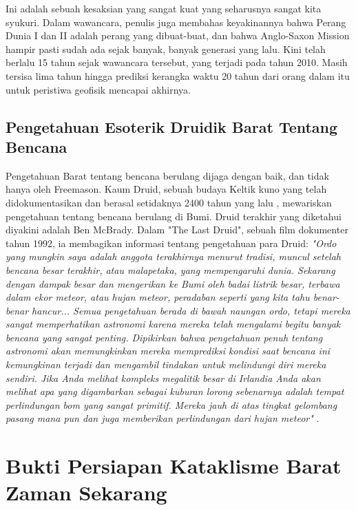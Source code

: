 \documentclass[10pt,twocolumn,letterpaper]{article}
\begin{document}
Ini adalah sebuah kesaksian yang sangat kuat yang seharusnya sangat kita syukuri. Dalam wawancara, penulis juga membahas keyakinannya bahwa Perang Dunia I dan II adalah perang yang dibuat-buat, dan bahwa Anglo-Saxon Mission hampir pasti sudah ada sejak banyak, banyak generasi yang lalu. Kini telah berlalu 15 tahun sejak wawancara tersebut, yang terjadi pada tahun 2010. Masih tersisa lima tahun hingga prediksi kerangka waktu 20 tahun dari orang dalam itu untuk peristiwa geofisik mencapai akhirnya.

\subsection{Pengetahuan Esoterik Druidik Barat Tentang Bencana}

Pengetahuan Barat tentang bencana berulang dijaga dengan baik, dan tidak hanya oleh Freemason. Kaum Druid, sebuah budaya Keltik kuno yang telah didokumentasikan dan berasal setidaknya 2400 tahun yang lalu \cite{7}, mewariskan pengetahuan tentang bencana berulang di Bumi. Druid terakhir yang diketahui diyakini adalah Ben McBrady. Dalam "The Last Druid", sebuah film dokumenter tahun 1992, ia membagikan informasi tentang pengetahuan para Druid: \textit{"Ordo yang mungkin saya adalah anggota terakhirnya menurut tradisi, muncul setelah bencana besar terakhir, atau malapetaka, yang mempengaruhi dunia. Sekarang dengan dampak besar dan mengerikan ke Bumi oleh badai listrik besar, terbawa dalam ekor meteor, atau hujan meteor, peradaban seperti yang kita tahu benar-benar hancur... Semua pengetahuan berada di bawah naungan ordo, tetapi mereka sangat memperhatikan astronomi karena mereka telah mengalami begitu banyak bencana yang sangat penting. Dipikirkan bahwa pengetahuan penuh tentang astronomi akan memungkinkan mereka memprediksi kondisi saat bencana ini kemungkinan terjadi dan mengambil tindakan untuk melindungi diri mereka sendiri. Jika Anda melihat kompleks megalitik besar di Irlandia Anda akan melihat apa yang digambarkan sebagai kuburan lorong sebenarnya adalah tempat perlindungan bom yang sangat primitif. Mereka jauh di atas tingkat gelombang pasang mana pun dan juga memberikan perlindungan dari hujan meteor"} \cite{8,9}.

\section{Bukti Persiapan Kataklisme Barat Zaman Sekarang}
\end{document}
